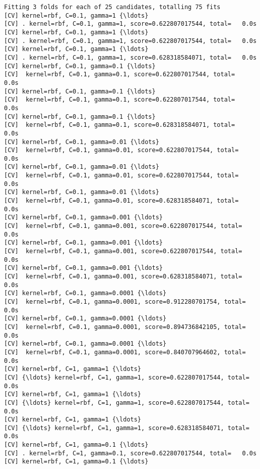 \documentclass[11pt]{article}
\begin{document}
    \begin{Verbatim}[commandchars=\\\{\}]
Fitting 3 folds for each of 25 candidates, totalling 75 fits
[CV] kernel=rbf, C=0.1, gamma=1 {\ldots}
[CV] . kernel=rbf, C=0.1, gamma=1, score=0.622807017544, total=   0.0s
[CV] kernel=rbf, C=0.1, gamma=1 {\ldots}
[CV] . kernel=rbf, C=0.1, gamma=1, score=0.622807017544, total=   0.0s
[CV] kernel=rbf, C=0.1, gamma=1 {\ldots}
[CV] . kernel=rbf, C=0.1, gamma=1, score=0.628318584071, total=   0.0s
[CV] kernel=rbf, C=0.1, gamma=0.1 {\ldots}
[CV]  kernel=rbf, C=0.1, gamma=0.1, score=0.622807017544, total=   0.0s
[CV] kernel=rbf, C=0.1, gamma=0.1 {\ldots}
[CV]  kernel=rbf, C=0.1, gamma=0.1, score=0.622807017544, total=   0.0s
[CV] kernel=rbf, C=0.1, gamma=0.1 {\ldots}
[CV]  kernel=rbf, C=0.1, gamma=0.1, score=0.628318584071, total=   0.0s
[CV] kernel=rbf, C=0.1, gamma=0.01 {\ldots}
[CV]  kernel=rbf, C=0.1, gamma=0.01, score=0.622807017544, total=   0.0s
[CV] kernel=rbf, C=0.1, gamma=0.01 {\ldots}
[CV]  kernel=rbf, C=0.1, gamma=0.01, score=0.622807017544, total=   0.0s
[CV] kernel=rbf, C=0.1, gamma=0.01 {\ldots}
[CV]  kernel=rbf, C=0.1, gamma=0.01, score=0.628318584071, total=   0.0s
[CV] kernel=rbf, C=0.1, gamma=0.001 {\ldots}
[CV]  kernel=rbf, C=0.1, gamma=0.001, score=0.622807017544, total=   0.0s
[CV] kernel=rbf, C=0.1, gamma=0.001 {\ldots}
[CV]  kernel=rbf, C=0.1, gamma=0.001, score=0.622807017544, total=   0.0s
[CV] kernel=rbf, C=0.1, gamma=0.001 {\ldots}
[CV]  kernel=rbf, C=0.1, gamma=0.001, score=0.628318584071, total=   0.0s
[CV] kernel=rbf, C=0.1, gamma=0.0001 {\ldots}
[CV]  kernel=rbf, C=0.1, gamma=0.0001, score=0.912280701754, total=   0.0s
[CV] kernel=rbf, C=0.1, gamma=0.0001 {\ldots}
[CV]  kernel=rbf, C=0.1, gamma=0.0001, score=0.894736842105, total=   0.0s
[CV] kernel=rbf, C=0.1, gamma=0.0001 {\ldots}
[CV]  kernel=rbf, C=0.1, gamma=0.0001, score=0.840707964602, total=   0.0s
[CV] kernel=rbf, C=1, gamma=1 {\ldots}
[CV] {\ldots} kernel=rbf, C=1, gamma=1, score=0.622807017544, total=   0.0s
[CV] kernel=rbf, C=1, gamma=1 {\ldots}
[CV] {\ldots} kernel=rbf, C=1, gamma=1, score=0.622807017544, total=   0.0s
[CV] kernel=rbf, C=1, gamma=1 {\ldots}
[CV] {\ldots} kernel=rbf, C=1, gamma=1, score=0.628318584071, total=   0.0s
[CV] kernel=rbf, C=1, gamma=0.1 {\ldots}
[CV] . kernel=rbf, C=1, gamma=0.1, score=0.622807017544, total=   0.0s
[CV] kernel=rbf, C=1, gamma=0.1 {\ldots}

    \end{Verbatim}
\end{document}
